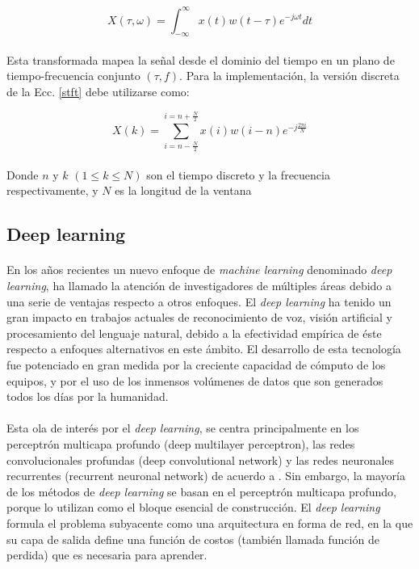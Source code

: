 \documentclass[12pt]{article}%
\begin{document}
\begin{equation}
\label{stft}
X(\tau,\omega)=\int_{-\infty}^{\infty}x(t)w(t-\tau)e^{-j\omega{t}}dt
\end{equation}

\paragraph{}
Esta transformada mapea la señal desde el dominio del tiempo en un plano de tiempo-frecuencia conjunto $(\tau,f)$. Para la implementación, la versión discreta de la Ecc. \ref{stft} debe utilizarse como:

\begin{equation}
X(k)=\sum_{i=n-\frac{N}{2}}^{i=n+\frac{N}{2}}x(i)w(i-n)e^{-j\frac{2{\pi}i}{N}}
\end{equation}

\paragraph{}
Donde $n$ y $k$ $(1{\leq}k{\leq}N)$ son el tiempo discreto y la frecuencia respectivamente, y $N$ es la longitud de la ventana

\subsection{Deep learning}
\paragraph{}

En los años recientes un nuevo enfoque de \textit{machine learning} denominado \textit{deep learning}, ha llamado la atención de investigadores de múltiples áreas debido a una serie de ventajas respecto a otros enfoques. El \textit{deep learning} ha tenido un gran impacto en trabajos actuales de reconocimiento de voz, visión artificial y procesamiento del lenguaje natural, debido a la efectividad empírica de éste respecto a enfoques alternativos en este ámbito. El desarrollo de esta tecnología fue potenciado en gran medida por la creciente capacidad de cómputo de los equipos, y por el uso de los inmensos volúmenes de datos que son generados todos los días por la humanidad.

\paragraph{}
Esta ola de interés por el \textit{deep learning}, se centra principalmente en los perceptrón multicapa profundo (deep multilayer perceptron), las redes convolucionales profundas (deep convolutional network) y las redes neuronales recurrentes (recurrent neuronal network) de acuerdo a \cite{mining}. Sin embargo, la mayoría de los métodos de \textit{deep learning} se basan en el perceptrón multicapa profundo, porque lo utilizan como el bloque esencial de construcción. El \textit{deep learning} formula el problema subyacente como una arquitectura en forma de red, en la que su capa de salida define una función de costos (también llamada función de perdida) que es necesaria para aprender.
\end{document}
